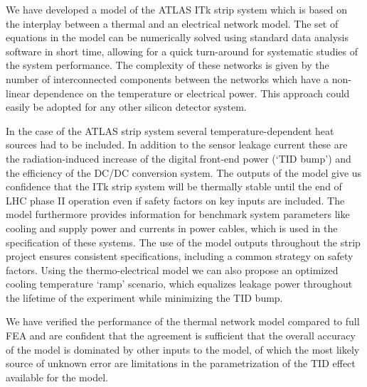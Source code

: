 We have developed a model of the ATLAS ITk strip system which is based on the interplay between a thermal and an electrical network model. The set of equations in the model can be numerically solved using standard data analysis software in short time, allowing for a quick turn-around for systematic studies of the system performance. The complexity of these networks is given by the number of interconnected components between the networks which have a non-linear dependence on the temperature or electrical power. This approach could easily be adopted for any other silicon detector system.

In the case of the ATLAS strip system several temperature-dependent heat sources had to be included. In addition to the sensor leakage current these are the  radiation-induced increase of the digital front-end power (`TID bump') and the efficiency of the DC/DC conversion system. The outputs of the model give us confidence that the ITk strip system will be thermally stable until the end of LHC phase II operation even if safety factors on key inputs are included. The model furthermore provides information for benchmark system parameters like cooling and supply power and currents in power cables, which is used in the specification of these systems. The use of the model outputs throughout the strip project ensures consistent specifications, including a common strategy on safety factors. Using the thermo-electrical model we can also propose an optimized cooling temperature `ramp' scenario, which equalizes leakage power throughout the lifetime of the experiment while minimizing the TID bump.

We have verified the performance of the thermal network model compared to full FEA and are confident that the agreement is sufficient that the overall accuracy of the model is dominated by other inputs to the model, of which the most likely source of unknown error are limitations in the parametrization of the TID effect available for the model.